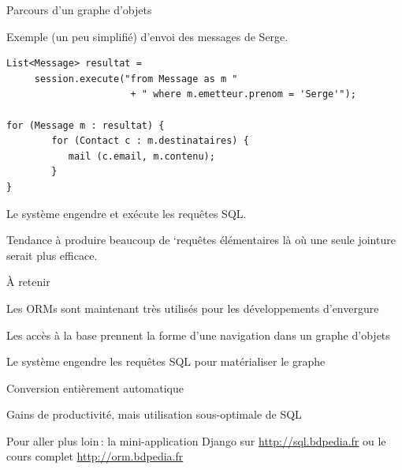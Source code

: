 \begin{frame}[fragile]{Parcours d'un graphe d'objets}

Exemple (un peu simplifié) d'envoi des messages de Serge. 
\vfill
\begin{verbatim}
List<Message> resultat =
     session.execute("from Message as m "
                      + " where m.emetteur.prenom = 'Serge'");
                      
for (Message m : resultat) {
        for (Contact c : m.destinataires) {
           mail (c.email, m.contenu);
        }
}
\end{verbatim}

\vfill

Le système engendre et exécute les requêtes SQL. 

\vfill

Tendance à 
produire \alert{beaucoup} de `requêtes élémentaires là où \alert{une seule}
jointure
serait plus efficace.
\end{frame}

\begin{frame}{À retenir}

Les ORMs sont maintenant très utilisés pour les développements d'envergure
\vfill

\begin{redbullet}
  \item Les accès à la base prennent la forme d'une navigation dans un graphe d'objets
  \item Le système engendre les requêtes SQL pour matérialiser le graphe
  \item Conversion entièrement automatique
  \item Gains de productivité, \alert{mais} utilisation sous-optimale de SQL
\end{redbullet}

\vfill
Pour aller plus loin\,: la mini-application Django sur \url{http://sql.bdpedia.fr}
ou le cours complet \url{http://orm.bdpedia.fr}

\end{frame}

